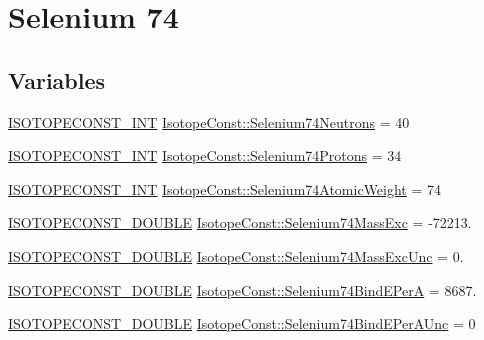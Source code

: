 \hypertarget{group___isotope_const-_selenium-_se74}{}\section{Selenium 74}
\label{group___isotope_const-_selenium-_se74}
\subsection*{Variables}
\begin{DoxyCompactItemize}
\item 
\mbox{\hyperlink{group___isotope_const-_macros_ga5f18360b3e99483a35c32d789e62621c}{I\+S\+O\+T\+O\+P\+E\+C\+O\+N\+S\+T\+\_\+\+I\+NT}} \mbox{\hyperlink{group___isotope_const-_selenium-_se74_ga5374e48a03d5d51601dbaae687e748e8}{Isotope\+Const\+::\+Selenium74\+Neutrons}} = 40
\item 
\mbox{\hyperlink{group___isotope_const-_macros_ga5f18360b3e99483a35c32d789e62621c}{I\+S\+O\+T\+O\+P\+E\+C\+O\+N\+S\+T\+\_\+\+I\+NT}} \mbox{\hyperlink{group___isotope_const-_selenium-_se74_gafad52f73b6299756964406e9b99cbe0a}{Isotope\+Const\+::\+Selenium74\+Protons}} = 34
\item 
\mbox{\hyperlink{group___isotope_const-_macros_ga5f18360b3e99483a35c32d789e62621c}{I\+S\+O\+T\+O\+P\+E\+C\+O\+N\+S\+T\+\_\+\+I\+NT}} \mbox{\hyperlink{group___isotope_const-_selenium-_se74_gafb65c9e28d1c73270668d6d202d500e6}{Isotope\+Const\+::\+Selenium74\+Atomic\+Weight}} = 74
\item 
\mbox{\hyperlink{group___isotope_const-_macros_ga8f45a7272ce02c0b4c65c44636ed719a}{I\+S\+O\+T\+O\+P\+E\+C\+O\+N\+S\+T\+\_\+\+D\+O\+U\+B\+LE}} \mbox{\hyperlink{group___isotope_const-_selenium-_se74_ga08554d04e09201d515038e075409879f}{Isotope\+Const\+::\+Selenium74\+Mass\+Exc}} = -\/72213.
\item 
\mbox{\hyperlink{group___isotope_const-_macros_ga8f45a7272ce02c0b4c65c44636ed719a}{I\+S\+O\+T\+O\+P\+E\+C\+O\+N\+S\+T\+\_\+\+D\+O\+U\+B\+LE}} \mbox{\hyperlink{group___isotope_const-_selenium-_se74_ga8e873b7834836466b89147b33aca864b}{Isotope\+Const\+::\+Selenium74\+Mass\+Exc\+Unc}} = 0.
\item 
\mbox{\hyperlink{group___isotope_const-_macros_ga8f45a7272ce02c0b4c65c44636ed719a}{I\+S\+O\+T\+O\+P\+E\+C\+O\+N\+S\+T\+\_\+\+D\+O\+U\+B\+LE}} \mbox{\hyperlink{group___isotope_const-_selenium-_se74_gac20c05f47e20ad1ac8000751b553c028}{Isotope\+Const\+::\+Selenium74\+Bind\+E\+PerA}} = 8687.
\item 
\mbox{\hyperlink{group___isotope_const-_macros_ga8f45a7272ce02c0b4c65c44636ed719a}{I\+S\+O\+T\+O\+P\+E\+C\+O\+N\+S\+T\+\_\+\+D\+O\+U\+B\+LE}} \mbox{\hyperlink{group___isotope_const-_selenium-_se74_gae6197db2c61d41e96ad62cca109383d0}{Isotope\+Const\+::\+Selenium74\+Bind\+E\+Per\+A\+Unc}} = 0

\end{DoxyCompactItemize}
